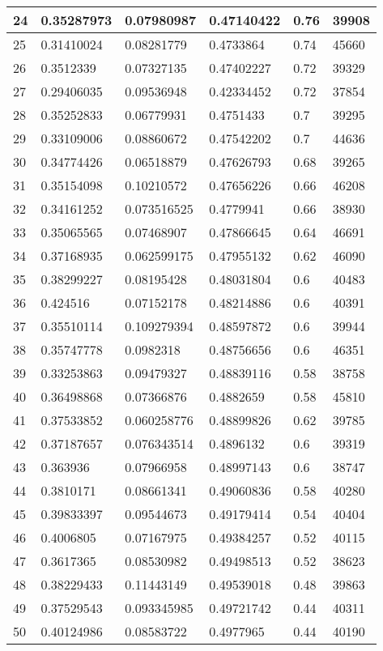 \begin{longtable}{|l|l|l|l|l|l|}
24 & 0.35287973 & 0.07980987 & 0.47140422 & 0.76 & 39908 \\ \hline 
25 & 0.31410024 & 0.08281779 & 0.4733864 & 0.74 & 45660 \\ \hline 
26 & 0.3512339 & 0.07327135 & 0.47402227 & 0.72 & 39329 \\ \hline 
27 & 0.29406035 & 0.09536948 & 0.42334452 & 0.72 & 37854 \\ \hline 
28 & 0.35252833 & 0.06779931 & 0.4751433 & 0.7 & 39295 \\ \hline 
29 & 0.33109006 & 0.08860672 & 0.47542202 & 0.7 & 44636 \\ \hline 
30 & 0.34774426 & 0.06518879 & 0.47626793 & 0.68 & 39265 \\ \hline 
31 & 0.35154098 & 0.10210572 & 0.47656226 & 0.66 & 46208 \\ \hline 
32 & 0.34161252 & 0.073516525 & 0.4779941 & 0.66 & 38930 \\ \hline 
33 & 0.35065565 & 0.07468907 & 0.47866645 & 0.64 & 46691 \\ \hline 
34 & 0.37168935 & 0.062599175 & 0.47955132 & 0.62 & 46090 \\ \hline 
35 & 0.38299227 & 0.08195428 & 0.48031804 & 0.6 & 40483 \\ \hline 
36 & 0.424516 & 0.07152178 & 0.48214886 & 0.6 & 40391 \\ \hline 
37 & 0.35510114 & 0.109279394 & 0.48597872 & 0.6 & 39944 \\ \hline 
38 & 0.35747778 & 0.0982318 & 0.48756656 & 0.6 & 46351 \\ \hline 
39 & 0.33253863 & 0.09479327 & 0.48839116 & 0.58 & 38758 \\ \hline 
40 & 0.36498868 & 0.07366876 & 0.4882659 & 0.58 & 45810 \\ \hline 
41 & 0.37533852 & 0.060258776 & 0.48899826 & 0.62 & 39785 \\ \hline 
42 & 0.37187657 & 0.076343514 & 0.4896132 & 0.6 & 39319 \\ \hline 
43 & 0.363936 & 0.07966958 & 0.48997143 & 0.6 & 38747 \\ \hline 
44 & 0.3810171 & 0.08661341 & 0.49060836 & 0.58 & 40280 \\ \hline 
45 & 0.39833397 & 0.09544673 & 0.49179414 & 0.54 & 40404 \\ \hline 
46 & 0.4006805 & 0.07167975 & 0.49384257 & 0.52 & 40115 \\ \hline 
47 & 0.3617365 & 0.08530982 & 0.49498513 & 0.52 & 38623 \\ \hline 
48 & 0.38229433 & 0.11443149 & 0.49539018 & 0.48 & 39863 \\ \hline 
49 & 0.37529543 & 0.093345985 & 0.49721742 & 0.44 & 40311 \\ \hline 
50 & 0.40124986 & 0.08583722 & 0.4977965 & 0.44 & 40190 \\ \hline 
\end{longtable}